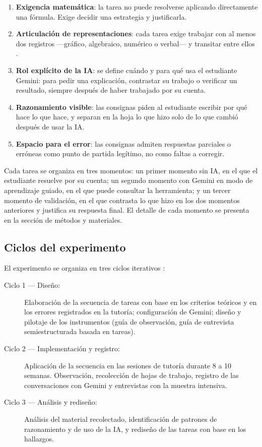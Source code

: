 \begin{enumerate}
  \item \textbf{Exigencia matemática}: la tarea no puede resolverse aplicando directamente una fórmula. Exige decidir una estrategia y justificarla.
  \item \textbf{Articulación de representaciones}: cada tarea exige trabajar con al menos dos registros ---gráfico, algebraico, numérico o verbal--- y transitar entre ellos \parencite{duval2006}.
  \item \textbf{Rol explícito de la IA}: se define cuándo y para qué usa el estudiante Gemini: para pedir una explicación, contrastar su trabajo o verificar un resultado, siempre después de haber trabajado por su cuenta.
  \item \textbf{Razonamiento visible}: las consignas piden al estudiante escribir por qué hace lo que hace, y separan en la hoja lo que hizo solo de lo que cambió después de usar la IA.
  \item \textbf{Espacio para el error}: las consignas admiten respuestas parciales o erróneas como punto de partida legítimo, no como faltas a corregir.
\end{enumerate}

Cada tarea se organiza en tres momentos: un primer momento sin IA, en el que el estudiante resuelve por su cuenta; un segundo momento con Gemini en modo de aprendizaje guiado, en el que puede consultar la herramienta; y un tercer momento de validación, en el que contrasta lo que hizo en los dos momentos anteriores y justifica su respuesta final. El detalle de cada momento se presenta en la sección de métodos y materiales.

\subsection{Ciclos del experimento}

El experimento se organiza en tres ciclos iterativos \parencite{cobb2003design}:

\begin{description}
  \item[Ciclo 1 --- Diseño:] Elaboración de la secuencia de tareas con base en los criterios teóricos y en los errores registrados en la tutoría; configuración de Gemini; diseño y pilotaje de los instrumentos (guía de observación, guía de entrevista semiestructurada basada en tareas).
  \item[Ciclo 2 --- Implementación y registro:] Aplicación de la secuencia en las sesiones de tutoría durante 8 a 10 semanas. Observación, recolección de hojas de trabajo, registro de las conversaciones con Gemini y entrevistas con la muestra intensiva.
  \item[Ciclo 3 --- Análisis y rediseño:] Análisis del material recolectado, identificación de patrones de razonamiento y de uso de la IA, y rediseño de las tareas con base en los hallazgos.
\end{description}

